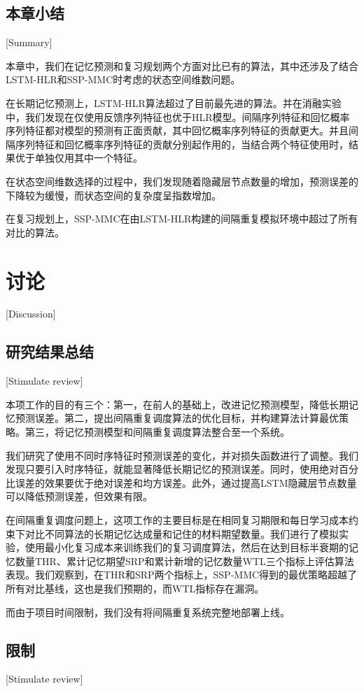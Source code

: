\section{本章小结}[Summary]

本章中，我们在记忆预测和复习规划两个方面对比已有的算法，其中还涉及了结合LSTM-HLR和SSP-MMC时考虑的状态空间维数问题。

在长期记忆预测上，LSTM-HLR算法超过了目前最先进的算法。并在消融实验中，我们发现在仅使用反馈序列特征也优于HLR模型。间隔序列特征和回忆概率序列特征都对模型的预测有正面贡献，其中回忆概率序列特征的贡献更大。并且间隔序列特征和回忆概率序列特征的贡献分别起作用的，当结合两个特征使用时，结果优于单独仅用其中一个特征。

在状态空间维数选择的过程中，我们发现随着隐藏层节点数量的增加，预测误差的下降较为缓慢，而状态空间的复杂度呈指数增加。

在复习规划上，SSP-MMC在由LSTM-HLR构建的间隔重复模拟环境中超过了所有对比的算法。

\chapter[讨论]{讨论}[Discussion]

\section{研究结果总结}[Stimulate review]

本项工作的目的有三个：第一，在前人的基础上，改进记忆预测模型，降低长期记忆预测误差。第二，提出间隔重复调度算法的优化目标，并构建算法计算最优策略。第三，将记忆预测模型和间隔重复调度算法整合至一个系统。

我们研究了使用不同时序特征时预测误差的变化，并对损失函数进行了调整。我们发现只要引入时序特征，就能显著降低长期记忆的预测误差。同时，使用绝对百分比误差的效果要优于绝对误差和均方误差。此外，通过提高LSTM隐藏层节点数量可以降低预测误差，但效果有限。

在间隔重复调度问题上，这项工作的主要目标是在相同复习期限和每日学习成本约束下对比不同算法的长期记忆达成量和记住的材料期望数量。我们进行了模拟实验，使用最小化复习成本来训练我们的复习调度算法，然后在达到目标半衰期的记忆数量THR、累计记忆期望SRP和累计新增的记忆数量WTL三个指标上评估算法表现。我们观察到，在THR和SRP两个指标上，SSP-MMC得到的最优策略超越了所有对比基线，这也是我们预期的，而WTL指标存在漏洞。

而由于项目时间限制，我们没有将间隔重复系统完整地部署上线。

\section{限制}[Stimulate review]

